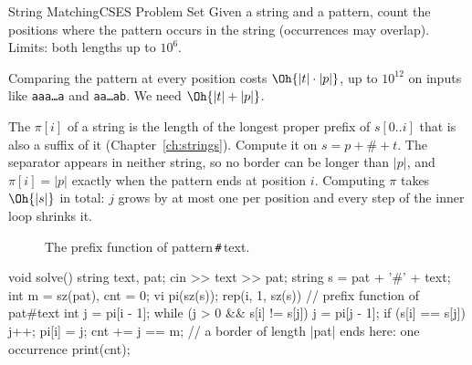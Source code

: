 \begin{statement}{String Matching}{CSES Problem Set}
Given a string and a pattern, count the positions where the pattern occurs in the string (occurrences may overlap).
Limits: both lengths up to $10^6$.
\end{statement}

 Comparing the pattern at every position costs $\Oh{|t|\cdot|p|}$, up to $10^{12}$ on inputs like
\texttt{aaa\ldots a} and \texttt{aa\ldots ab}. We need $\Oh{|t| + |p|}$.

 The  $\pi[i]$ of a string is the length of the longest proper prefix of
$s[0..i]$ that is also a suffix of it (Chapter~\ref{ch:strings}). Compute it on $s = p + \texttt{\#} + t$. The separator
appears in neither string, so no border can be longer than $|p|$, and $\pi[i] = |p|$ exactly when the pattern ends at
position $i$. Computing $\pi$ takes $\Oh{|s|}$ in total: $j$ grows by at most one per position and every step of the inner
 loop shrinks it.

\begin{figure}[H]
\centering
{}
\caption{The prefix function of pattern\,\texttt{\#}\,text.}
\end{figure}

\begin{code}
void solve() {
    string text, pat;
    cin >> text >> pat;
    string s = pat + '#' + text;
    int m = sz(pat), cnt = 0;
    vi pi(sz(s));
    rep(i, 1, sz(s)) {  // prefix function of pat#text
        int j = pi[i - 1];
        while (j > 0 && s[i] != s[j]) j = pi[j - 1];
        if (s[i] == s[j]) j++;
        pi[i] = j;
        cnt += j == m;  // a border of length |pat| ends here: one occurrence
    }
    print(cnt);
}
\end{code}


